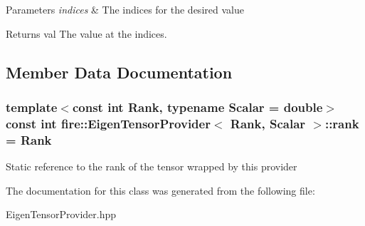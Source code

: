 \begin{DoxyParams}{Parameters}
{\em indices} & The indices for the desired value \\
\hline
\end{DoxyParams}
\begin{DoxyReturn}{Returns}
val The value at the indices. 
\end{DoxyReturn}


\subsection{Member Data Documentation}
\subsubsection[{\texorpdfstring{rank}{rank}}]{\setlength{\rightskip}{0pt plus 5cm}template$<$const int Rank, typename Scalar = double$>$ const int {\bf fire\+::\+Eigen\+Tensor\+Provider}$<$ Rank, Scalar $>$\+::rank = Rank\hspace{0.3cm}{\ttfamily [static]}}\hypertarget{a00084_ae8f0217985d78dba31d7bdb95ace1e43}{}\label{a00084_ae8f0217985d78dba31d7bdb95ace1e43}
Static reference to the rank of the tensor wrapped by this provider 

The documentation for this class was generated from the following file\+:\begin{DoxyCompactItemize}
\item 
Eigen\+Tensor\+Provider.\+hpp\end{DoxyCompactItemize}
